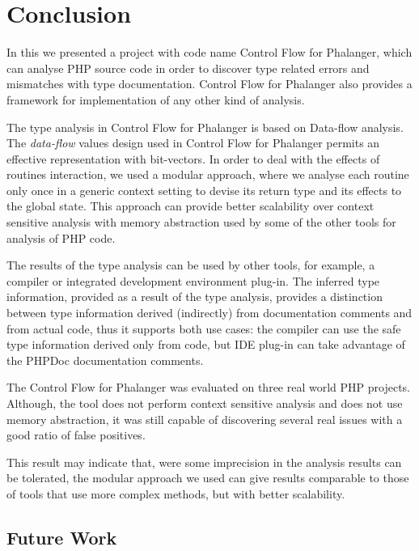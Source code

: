 \chapter{Conclusion}

    In this \wthesis{} we presented a project with code name 
    Control Flow for Phalanger, which can analyse PHP 
    source code in order to discover type related errors 
    and mismatches with type documentation. Control Flow 
    for Phalanger also provides a framework for 
    implementation of any other kind of analysis.
    
    The type analysis in Control Flow for Phalanger 
    is based on Data-flow analysis. The \emph{data-flow} 
    values design used in Control Flow for Phalanger 
    permits an effective representation with bit-vectors.
    In order to deal with the effects of routines 
    interaction, we used a modular approach, where 
    we analyse each routine only once in a generic 
    context setting to devise its return type and its 
    effects to the global state. This approach 
    can provide better scalability over 
    context sensitive analysis with memory 
    abstraction used by some of the other tools 
    for analysis of PHP code.
    
    The results of the type analysis can be used 
    by other tools, for example, a compiler or 
    integrated development environment plug-in. 
    The inferred type information, provided as 
    a result of the type analysis, provides a 
    distinction between type information derived 
    (indirectly) from documentation comments and 
    from actual code, thus it supports both 
    use cases: the compiler can use the safe 
    type information derived only from code, 
    but IDE plug-in can take advantage of the 
    PHPDoc documentation comments.
    
    The Control Flow for Phalanger was evaluated on 
    three real world PHP projects. Although, the tool 
    does not perform context sensitive analysis and 
    does not use memory abstraction, it was still 
    capable of discovering several real issues with 
    a good ratio of false positives.
    
    This result may indicate that, were some imprecision 
    in the analysis results can be tolerated, the 
    modular approach we used can give results comparable 
    to those of tools that use more complex methods, 
    but with better scalability.

    \section{Future Work}
    
